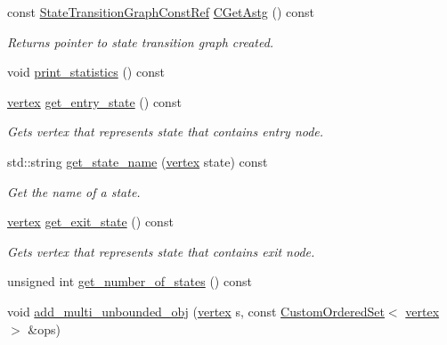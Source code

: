 \begin{DoxyCompactItemize}
const \hyperlink{state__transition__graph_8hpp_aa722f3ba42caaaafcacdec07925f6b06}{State\+Transition\+Graph\+Const\+Ref} \hyperlink{classStateTransitionGraphManager_acfc0d7f26c027841313d410893d4fddc}{C\+Get\+Astg} () const
\begin{DoxyCompactList}\small\item\em Returns pointer to state transition graph created. \end{DoxyCompactList}\item 
void \hyperlink{classStateTransitionGraphManager_ab58c3818c8f95a5184b14abc1df67219}{print\+\_\+statistics} () const
\item 
\hyperlink{graph_8hpp_abefdcf0544e601805af44eca032cca14}{vertex} \hyperlink{classStateTransitionGraphManager_acb90f4df2f87498dc08fa9303e7adae5}{get\+\_\+entry\+\_\+state} () const
\begin{DoxyCompactList}\small\item\em Gets vertex that represents state that contains entry node. \end{DoxyCompactList}\item 
std\+::string \hyperlink{classStateTransitionGraphManager_a4cc1e1dafee9039389d7c273568d4e9a}{get\+\_\+state\+\_\+name} (\hyperlink{graph_8hpp_abefdcf0544e601805af44eca032cca14}{vertex} state) const
\begin{DoxyCompactList}\small\item\em Get the name of a state. \end{DoxyCompactList}\item 
\hyperlink{graph_8hpp_abefdcf0544e601805af44eca032cca14}{vertex} \hyperlink{classStateTransitionGraphManager_a90b68762a4640636759ca382c0e87aaf}{get\+\_\+exit\+\_\+state} () const
\begin{DoxyCompactList}\small\item\em Gets vertex that represents state that contains exit node. \end{DoxyCompactList}\item 
unsigned int \hyperlink{classStateTransitionGraphManager_a4ddb4b8f791ecffb4758dd4328b9f0fc}{get\+\_\+number\+\_\+of\+\_\+states} () const
\item 
void \hyperlink{classStateTransitionGraphManager_a68c5f876edcd76e7cc218d38623c043e}{add\+\_\+multi\+\_\+unbounded\+\_\+obj} (\hyperlink{graph_8hpp_abefdcf0544e601805af44eca032cca14}{vertex} s, const \hyperlink{classCustomOrderedSet}{Custom\+Ordered\+Set}$<$ \hyperlink{graph_8hpp_abefdcf0544e601805af44eca032cca14}{vertex} $>$ \&ops)
\item 

\end{DoxyCompactItemize}
